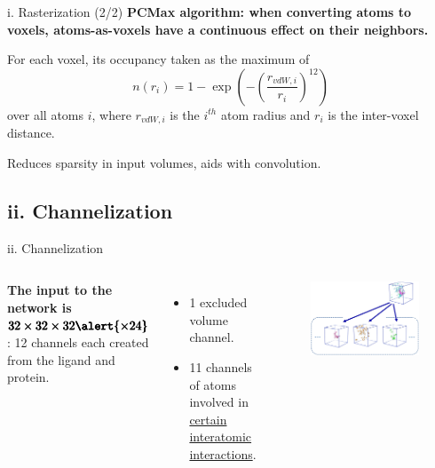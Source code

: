 \documentclass[aspectratio=169,xcolor=dvipsnames]{beamer}
\begin{document}
\begin{frame}{i. Rasterization (2/2)}
    \textbf{PCMax algorithm: when converting atoms to voxels, atoms-as-voxels
    have a continuous effect on their neighbors.}
    \vspace{3mm}

    For each voxel, its occupancy taken as the maximum of
    \begin{equation*}
        n(r_i) = 1 - \exp\left(-\left(\frac{r_{vdW, i}}{r_i}\right)^{12}\right)
    \end{equation*}
    over all atoms $i$, where $r_{vdW, i}$ is the $i^{th}$ atom radius and $r_i$ is the inter-voxel distance.
    \vspace{2mm}
    
    Reduces sparsity in input volumes, aids with convolution.
\end{frame}


\subsection{ii. Channelization}
\begin{frame}{ii. Channelization}
    \begin{columns}[c]
        \textbf{The input to the network is}
        $\pmb{32\times32\times32\alert{\times24}}$: 12 channels each
        created from the ligand and protein.
        \begin{itemize}
            \item 1 excluded volume channel.
            \item 11 channels of atoms involved in 
            \href{http://biosig.unimelb.edu.au/arpeggioweb/calculate/}
            {certain interatomic interactions}.
        \end{itemize}
        \begin{figure}
            \includegraphics[width=\textwidth]{images/grid_bottom}
        \end{figure}
    \end{columns}
\end{frame}
\end{document}
